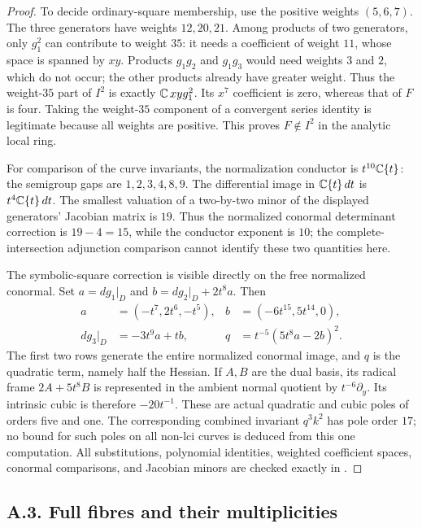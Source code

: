 \begin{proof}
To decide ordinary-square membership, use the positive weights
$(5,6,7)$. The three generators have weights $12,20,21$.
Among products of two generators, only $g_1^2$ can contribute
to weight $35$: it needs a coefficient of weight $11$, whose
space is spanned by $xy$. Products $g_1g_2$ and $g_1g_3$ would
need weights $3$ and $2$, which do not occur; the other products
already have greater weight. Thus the weight-$35$ part of $I^2$
is exactly $\mathbb C\,xyg_1^2$. Its $x^7$ coefficient is zero, whereas
that of $F$ is four. Taking the weight-$35$ component of a
convergent series identity is legitimate because all weights are
positive. This proves $F\notin I^2$ in the analytic local ring.

For comparison of the curve invariants, the normalization conductor
is $t^{10}\mathbb C\{t\}$: the semigroup gaps are $1,2,3,4,8,9$.
The differential image in $\mathbb C\{t\}\,dt$ is $t^4\mathbb C\{t\}\,dt$.
The smallest valuation of a two-by-two minor of the displayed
generators' Jacobian matrix is $19$. Thus the normalized conormal
determinant correction is $19-4=15$, while the conductor exponent
is $10$; the complete-intersection adjunction comparison cannot
identify these two quantities here.

The symbolic-square correction is visible directly on the free
normalized conormal. Set $a=dg_1|_D$ and
$b=dg_2|_D+2t^8a$. Then
\[
 \begin{aligned}
 a&=(-t^7,2t^6,-t^5),& b&=(-6t^{15},5t^{14},0),\\
 dg_3|_D&=-3t^9a+tb,&
 q&=t^{-5}(5t^8a-2b)^2.
 \end{aligned}                                                   \tag{A.NL.5}
\]
The first two rows generate the entire normalized conormal image,
and $q$ is the quadratic term, namely half the Hessian.
If $A,B$ are the dual basis, its radical frame $2A+5t^8B$
is represented in the ambient normal quotient by $t^{-6}\partial_y$.
Its intrinsic cubic is therefore $-20t^{-1}$. These are actual
quadratic and cubic poles of orders five and one. The corresponding
combined invariant $q^3k^2$ has pole order $17$; no bound for such
poles on all non-lci curves is deduced from this one computation.
All substitutions, polynomial identities, weighted coefficient
spaces, conormal comparisons, and Jacobian minors are checked
exactly in .
\end{proof}


\subsection{A.3. Full fibres and their multiplicities}

